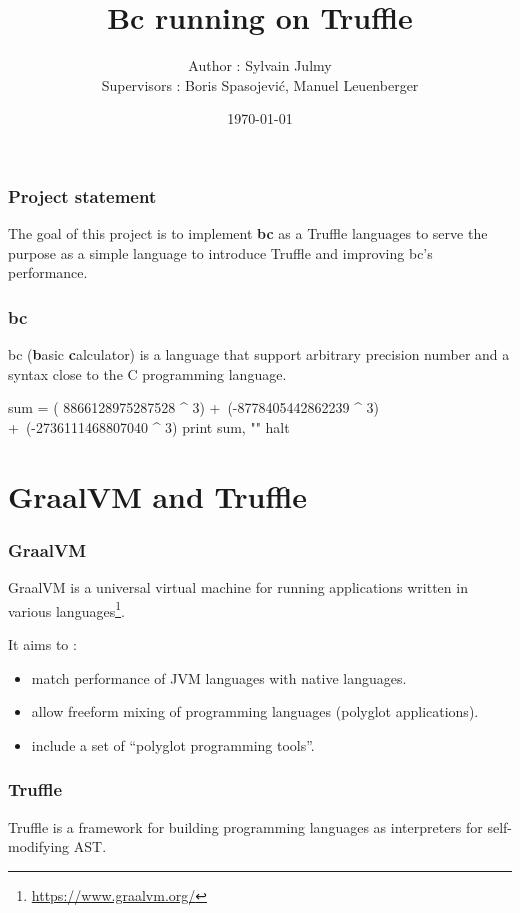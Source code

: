 \documentclass[11pt,handout]{beamer}
\author[Sylvain Julmy]{Author : Sylvain Julmy\\\vspace*{0.2cm}Supervisors : Boris Spasojević, Manuel Leuenberger}
\title[SCG Seminar]{Bc running on Truffle}
\date{\today}
\begin{document}
\maketitle

\begin{frame}[fragile]
  \frametitle{Project statement}
  
  The goal of this project is to implement \textbf{bc} as a Truffle languages to serve
  the purpose as a simple language to introduce Truffle and improving bc's
  performance.
\end{frame}

\begin{frame}[fragile]
  \frametitle{bc}
  bc (\textbf{b}asic \textbf{c}alculator) is a language that support arbitrary
  precision number and a syntax close to the C programming language.

\begin{bccode}
sum = ( 8866128975287528 ^ 3) +\
      (-8778405442862239 ^ 3) +\
      (-2736111468807040 ^ 3)
print sum, "\n"
halt
\end{bccode}
\end{frame}

\section[GraalVM and Truffle]{GraalVM and Truffle}

\begin{frame}[fragile]
  \frametitle{GraalVM}
  GraalVM is a universal virtual machine for running applications written in
  various languages\footnote{\url{https://www.graalvm.org/}}.

  It aims to :
  \begin{itemize}
  \item match performance of JVM languages with native languages.
  \item allow freeform mixing of programming languages (polyglot applications).
  \item include a set of ``polyglot programming tools''.
  \end{itemize}
\end{frame}

\begin{frame}[fragile]
  \frametitle{Truffle}
  Truffle is a framework for building programming languages as interpreters for
  self-modifying AST.
\end{frame}
\end{document}
